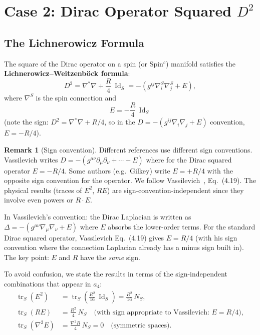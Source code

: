\documentclass[12pt,a4paper]{article}
\theoremstyle{definition}
\newtheorem{remark}{Remark}
\DeclareMathOperator{\tr}{tr}
\DeclareMathOperator{\Id}{Id}
\begin{document}
\section{Case 2: Dirac Operator Squared $D^2$}
\label{sec:dirac}

\subsection{The Lichnerowicz Formula}

The square of the Dirac operator on a spin (or Spin$^c$) manifold
satisfies the \textbf{Lichnerowicz--Weitzenb\"ock formula}:
\begin{equation}\label{eq:lich}
D^2 = \nabla^*\nabla + \frac{R}{4}\,\Id_S
  = -\left(g^{ij}\nabla^S_i\nabla^S_j + E\right),
\end{equation}
where $\nabla^S$ is the spin connection and
\begin{equation}\label{eq:E-dirac}
\boxed{E = -\frac{R}{4}\,\Id_S}
\end{equation}
(note the sign: $D^2 = \nabla^*\nabla + R/4$, so in the
$D = -(g^{ij}\nabla_i\nabla_j + E)$ convention, $E = -R/4$).

\begin{remark}[Sign convention]
Different references use different sign conventions.  Vassilevich
writes $D = -(g^{\mu\nu}\partial_\mu\partial_\nu + \cdots + E)$
where for the Dirac squared operator $E = -R/4$.  Some authors
(e.g.\ Gilkey) write $E = +R/4$ with the opposite sign convention
for the operator.  We follow Vassilevich~\cite{Vassilevich2003},
Eq.~(4.19).  The physical results (traces of $E^2$, $RE$) are
sign-convention-independent since they involve even powers or
$R \cdot E$.

In Vassilevich's convention: the Dirac Laplacian is written as
$\Delta = -(g^{\mu\nu}\nabla_\mu\nabla_\nu + E)$ where $E$
absorbs the lower-order terms.  For the standard Dirac squared
operator, Vassilevich Eq.~(4.19) gives $E = R/4$ (with his sign
convention where the connection Laplacian already has a minus sign
built in).  The key point: $E$ and $R$ have the \emph{same} sign.
\end{remark}

To avoid confusion, we state the results in terms of the
sign-independent combinations that appear in $a_4$:
\begin{align}
\tr_S(E^2) &= \tr_S\!\left(\frac{R^2}{16}\,\Id_S\right)
  = \frac{R^2}{16}\,N_S, \\
\tr_S(RE) &= \frac{R^2}{4}\,N_S \quad
  \text{(with sign appropriate to Vassilevich: $E = R/4$)}, \\
\tr_S(\nabla^2 E) &= \frac{\nabla^2 R}{4}\,N_S = 0
  \quad\text{(symmetric spaces)}.
\end{align}
\end{document}
